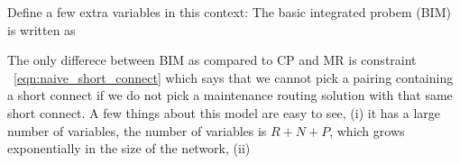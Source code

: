 \documentclass[letterpaper, 10pt, twocolumn, reqno]{amsart}
\begin{document}
Define a few extra variables in this context:
The basic integrated probem (BIM) is written as

The only differece between BIM as compared to CP and MR is constraint ~\eqref{eqn:naive_short_connect} which says that we cannot pick a pairing containing a short connect if we do not pick a maintenance routing solution with that same short connect. A few things about this model are easy to see, (i) it has a large number of variables, the number of variables is $R + N+P$, which grows exponentially in the size of the network, (ii) 
\end{document}
